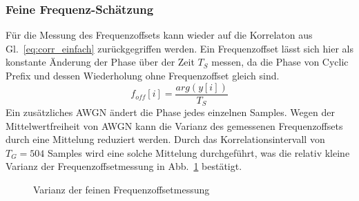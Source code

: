 \subsubsection{Feine Frequenz-Schätzung}
Für die Messung des Frequenzoffsets kann wieder auf die Korrelaton aus Gl.~\ref{eq:corr_einfach} zurückgegriffen werden. Ein Frequenzoffset lässt sich hier als konstante Änderung der Phase über der Zeit $T_S$ messen, da die Phase von Cyclic Prefix und dessen Wiederholung ohne Frequenzoffset gleich sind. 
\begin{equation}
f_{off}[i] = \frac{arg(y[i])}{T_S}
\label{eq:fine_frequency_estimation}
\end{equation}
Ein zusätzliches \ac{AWGN} ändert die Phase jedes einzelnen Samples. Wegen der Mittelwertfreiheit von \ac{AWGN} kann die Varianz des gemessenen Frequenzoffsets durch eine Mittelung reduziert werden.
Durch das Korrelationsintervall von $T_G = 504$ Samples wird eine solche Mittelung durchgeführt, was die relativ kleine Varianz der Frequenzoffsetmessung in Abb.~\ref{plot:varianz_freq_offset} bestätigt.
\begin{figure}
\begin{center}
\end{center}
\label{plot:varianz_freq_offset}
\caption{Varianz der feinen Frequenzoffsetmessung}
\end{figure}

